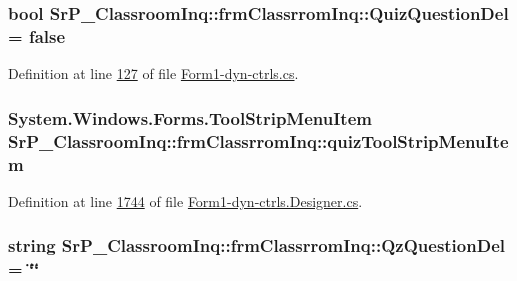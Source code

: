 \hypertarget{class_sr_p___classroom_inq_1_1frm_classrrom_inq_aa1c6ba1dda756081aba5b3cfea87b09d}{
\subsubsection[{\-Quiz\-Question\-Del}]{\setlength{\rightskip}{0pt plus 5cm}bool {\bf \-Sr\-P\-\_\-\-Classroom\-Inq\-::frm\-Classrrom\-Inq\-::\-Quiz\-Question\-Del} = false}}
\label{class_sr_p___classroom_inq_1_1frm_classrrom_inq_aa1c6ba1dda756081aba5b3cfea87b09d}


\-Definition at line \hyperlink{_form1-dyn-ctrls_8cs_source_l00127}{127} of file \hyperlink{_form1-dyn-ctrls_8cs_source}{\-Form1-\/dyn-\/ctrls.\-cs}.

\hypertarget{class_sr_p___classroom_inq_1_1frm_classrrom_inq_a01bd4f13b978688a925fcace4c5f92bc}{
\subsubsection[{quiz\-Tool\-Strip\-Menu\-Item}]{\setlength{\rightskip}{0pt plus 5cm}\-System.\-Windows.\-Forms.\-Tool\-Strip\-Menu\-Item {\bf \-Sr\-P\-\_\-\-Classroom\-Inq\-::frm\-Classrrom\-Inq\-::quiz\-Tool\-Strip\-Menu\-Item}}}
\label{class_sr_p___classroom_inq_1_1frm_classrrom_inq_a01bd4f13b978688a925fcace4c5f92bc}


\-Definition at line \hyperlink{_form1-dyn-ctrls_8_designer_8cs_source_l01744}{1744} of file \hyperlink{_form1-dyn-ctrls_8_designer_8cs_source}{\-Form1-\/dyn-\/ctrls.\-Designer.\-cs}.

\hypertarget{class_sr_p___classroom_inq_1_1frm_classrrom_inq_a1fe88369748706492ccc7292a0e47331}{
\subsubsection[{\-Qz\-Question\-Del}]{\setlength{\rightskip}{0pt plus 5cm}string {\bf \-Sr\-P\-\_\-\-Classroom\-Inq\-::frm\-Classrrom\-Inq\-::\-Qz\-Question\-Del} = \char`\"{}\char`\"{}}}
\label{class_sr_p___classroom_inq_1_1frm_classrrom_inq_a1fe88369748706492ccc7292a0e47331}


